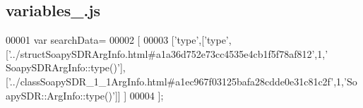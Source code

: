 \subsection{variables\+\_.\+js}
\label{variables__7_8js_source}

\begin{DoxyCode}
00001 var searchData=
00002 [
00003   [\textcolor{stringliteral}{'type'},[\textcolor{stringliteral}{'type'},[\textcolor{stringliteral}{'../structSoapySDRArgInfo.html#a1a36d752e73cc4535e4cb1f5f78af812'},1,\textcolor{stringliteral}{'
      SoapySDRArgInfo::type()'}],[\textcolor{stringliteral}{'../classSoapySDR\_1\_1ArgInfo.html#a1ec967f03125bafa28cdde0e31c81c2f'},1,\textcolor{stringliteral}{'SoapySDR::ArgInfo::type()'}]]
      ]
00004 ];
\end{DoxyCode}
